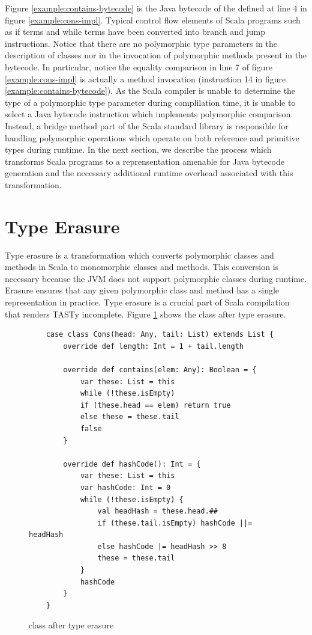 Figure \ref{example:contains-bytecode} is the Java bytecode of the  defined at line 4 in figure \ref{example:cons-impl}.
Typical control flow elements of Scala programs such as if terms and while terms have been converted into branch and jump instructions.
Notice that there are no polymorphic type parameters in the description of classes nor in the invocation of polymorphic methods present in the bytecode.
In particular, notice the equality comparison in line 7 of figure \ref{example:cons-impl} is actually a method invocation (instruction 14 in figure \ref{example:contains-bytecode}).
As the Scala compiler is unable to determine the type of a polymorphic type parameter during complilation time, it is unable to select a Java bytecode instruction which implements polymorphic comparison.
Instead, a bridge method part of the Scala standard library is responsible for handling polymorphic operations which operate on both reference and primitive types during runtime.
In the next section, we describe the process which transforms Scala programs to a reprensentation amenable for Java bytecode generation and the necessary additional runtime overhead associated with this transformation.

\section{Type Erasure}
\label{background:type-erasure}

Type erasure\cite{java:generics} is a transformation which converts polymorphic classes and methods in Scala to monomorphic classes and methods. 
This conversion is necessary because the JVM does not support polymorphic classes during runtime.
Erasure ensures that any given polymorphic class and method has a single representation in practice.
Type erasure is a crucial part of Scala compilation that renders TASTy incomplete.
Figure \ref{example:erase-cons} shows the  class after type erasure.

\begin{figure}[!htb]
	\begin{verbatim}
	case class Cons(head: Any, tail: List) extends List {
		override def length: Int = 1 + tail.length
			
		override def contains(elem: Any): Boolean = {
			var these: List = this
			while (!these.isEmpty) 
			if (these.head == elem) return true
			else these = these.tail
			false
		}
			
		override def hashCode(): Int = {
			var these: List = this
			var hashCode: Int = 0
			while (!these.isEmpty) {
				val headHash = these.head.##
				if (these.tail.isEmpty) hashCode ||= headHash
				else hashCode |= headHash >> 8
				these = these.tail	
			}
			hashCode
		}
	}		
	\end{verbatim}
	\caption{ class after type erasure}
	\label{example:erase-cons}
\end{figure}

